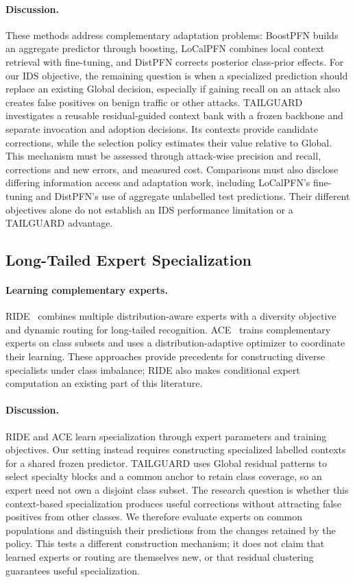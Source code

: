 \documentclass[sigconf,anonymous,pbalance]{acmart}
\begin{document}
\paragraph{Discussion.}
These methods address complementary adaptation problems: BoostPFN builds an aggregate predictor through boosting, LoCalPFN combines local context retrieval with fine-tuning, and DistPFN corrects posterior class-prior effects. For our IDS objective, the remaining question is when a specialized prediction should replace an existing Global decision, especially if gaining recall on an attack also creates false positives on benign traffic or other attacks. TAILGUARD investigates a reusable residual-guided context bank with a frozen backbone and separate invocation and adoption decisions. Its contexts provide candidate corrections, while the selection policy estimates their value relative to Global. This mechanism must be assessed through attack-wise precision and recall, corrections and new errors, and measured cost. Comparisons must also disclose differing information access and adaptation work, including LoCalPFN's fine-tuning and DistPFN's use of aggregate unlabelled test predictions. Their different objectives alone do not establish an IDS performance limitation or a TAILGUARD advantage.

\subsection{Long-Tailed Expert Specialization}
\paragraph{Learning complementary experts.}
RIDE~\cite{wang2020long} combines multiple distribution-aware experts with a diversity objective and dynamic routing for long-tailed recognition. ACE~\cite{Cai_2021_ICCV} trains complementary experts on class subsets and uses a distribution-adaptive optimizer to coordinate their learning. These approaches provide precedents for constructing diverse specialists under class imbalance; RIDE also makes conditional expert computation an existing part of this literature.

\paragraph{Discussion.}
RIDE and ACE learn specialization through expert parameters and training objectives. Our setting instead requires constructing specialized labelled contexts for a shared frozen predictor. TAILGUARD uses Global residual patterns to select specialty blocks and a common anchor to retain class coverage, so an expert need not own a disjoint class subset. The research question is whether this context-based specialization produces useful corrections without attracting false positives from other classes. We therefore evaluate experts on common populations and distinguish their predictions from the changes retained by the policy. This tests a different construction mechanism; it does not claim that learned experts or routing are themselves new, or that residual clustering guarantees useful specialization.
\end{document}
